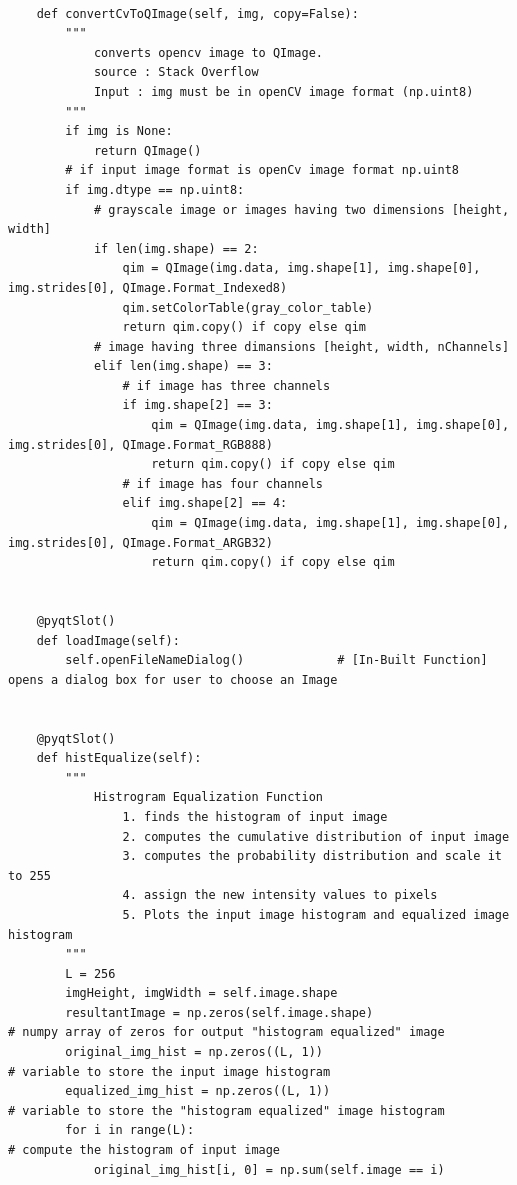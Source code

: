\documentclass[letterpaper, 10 pt, conference]{ieeeconf}  %
\begin{document}
\begin{mdframed}
\begin{lstlisting}
    
    def convertCvToQImage(self, img, copy=False):
        """
            converts opencv image to QImage. 
            source : Stack Overflow
            Input : img must be in openCV image format (np.uint8)
        """
        if img is None:
            return QImage()
        # if input image format is openCv image format np.uint8
        if img.dtype == np.uint8:
            # grayscale image or images having two dimensions [height, width]
            if len(img.shape) == 2:
                qim = QImage(img.data, img.shape[1], img.shape[0], img.strides[0], QImage.Format_Indexed8)
                qim.setColorTable(gray_color_table)
                return qim.copy() if copy else qim
            # image having three dimansions [height, width, nChannels]
            elif len(img.shape) == 3:
                # if image has three channels
                if img.shape[2] == 3:
                    qim = QImage(img.data, img.shape[1], img.shape[0], img.strides[0], QImage.Format_RGB888)
                    return qim.copy() if copy else qim
                # if image has four channels
                elif img.shape[2] == 4:
                    qim = QImage(img.data, img.shape[1], img.shape[0], img.strides[0], QImage.Format_ARGB32)
                    return qim.copy() if copy else qim

    
    @pyqtSlot()
    def loadImage(self):
        self.openFileNameDialog()             # [In-Built Function] opens a dialog box for user to choose an Image

    
    @pyqtSlot()
    def histEqualize(self):
        """
            Histrogram Equalization Function
                1. finds the histogram of input image
                2. computes the cumulative distribution of input image
                3. computes the probability distribution and scale it to 255
                4. assign the new intensity values to pixels
                5. Plots the input image histogram and equalized image histogram 
        """
        L = 256
        imgHeight, imgWidth = self.image.shape
        resultantImage = np.zeros(self.image.shape)                          # numpy array of zeros for output "histogram equalized" image
        original_img_hist = np.zeros((L, 1))                                  # variable to store the input image histogram
        equalized_img_hist = np.zeros((L, 1))                                 # variable to store the "histogram equalized" image histogram
        for i in range(L):                                                   # compute the histogram of input image
            original_img_hist[i, 0] = np.sum(self.image == i)


\end{lstlisting}
\end{mdframed}
\end{document}
